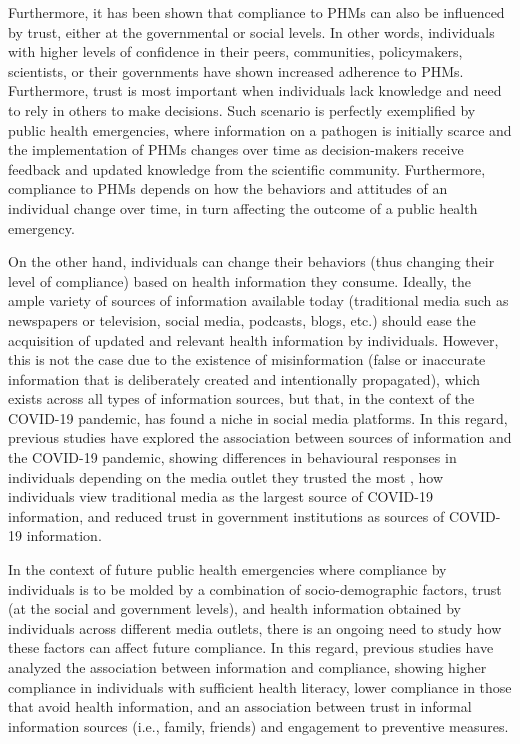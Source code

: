 \documentclass[11pt]{article} %
\begin{document}
Furthermore, it has been shown that compliance to PHMs can also be influenced by trust, either at the governmental or social levels\cite{zaki2022, schumpe2022, nivette2021, pak2021, shanka2022, bargain2020, brouard2020, clark2020, blair2017, wright2021, nwakasi2022}. In other words, individuals with higher levels of confidence in their peers, communities, policymakers, scientists, or their governments have shown increased adherence to PHMs. Furthermore, trust is most important when individuals lack knowledge and need to rely in others to make decisions\cite{siegrist2014}. Such scenario is perfectly exemplified by public health emergencies, where information on a pathogen is initially scarce and the implementation of PHMs changes over time as decision-makers receive feedback and updated knowledge from the scientific community. Furthermore, compliance to PHMs depends on how the behaviors and attitudes of an individual change over time, in turn affecting the outcome of a public health emergency\cite{roma2020}. 

On the other hand, individuals can change their behaviors (thus changing their level of compliance) based on health information they consume\cite{buonomo2020, bavel2020}. Ideally, the ample variety of sources of information available today (traditional media such as newspapers or television, social media, podcasts, blogs, etc.) should ease the acquisition of updated and relevant health information by individuals. However, this is not the case due to the existence of misinformation (false or inaccurate information that is deliberately created and intentionally propagated\cite{wu2019}), which exists across all types of information sources, but that, in the context of the COVID-19 pandemic, has found a niche in social media platforms\cite{walter2020, moran2020}. In this regard, previous studies have explored the association between sources of information and the COVID-19 pandemic, showing differences in behavioural responses in individuals depending on the media outlet they trusted the most \cite{zhao2020}, how individuals view traditional media as the largest source of COVID-19 information\cite{ali2020}, and reduced trust in government institutions as sources of COVID-19 information\cite{latkin2020}.

In the context of future public health emergencies where compliance by individuals is to be molded by a combination of socio-demographic factors, trust (at the social and government levels), and health information obtained by individuals across different media outlets, there is an ongoing need to study how these factors can affect future compliance. In this regard, previous studies have analyzed the association between information and compliance, showing higher compliance in individuals with sufficient health literacy\cite{hermans2021}, lower compliance in those that avoid health information\cite{siebenhaar2020}, and an association between trust in informal information sources (i.e., family, friends) and engagement to preventive measures\cite{maykrantz2021}.
\end{document}
